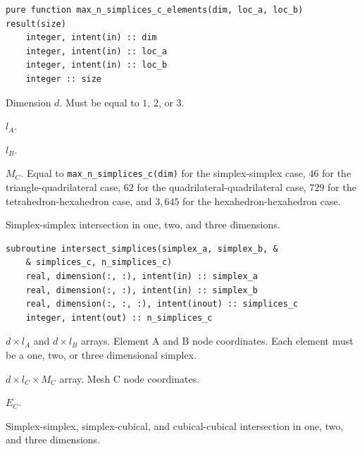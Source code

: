 \documentclass{article}
\begin{document}
\begin{lstlisting}[language=FORTRAN]
  pure function max_n_simplices_c_elements(dim, loc_a, loc_b) result(size)
    integer, intent(in) :: dim
    integer, intent(in) :: loc_a
    integer, intent(in) :: loc_b
    integer :: size
\end{lstlisting}

\begin{description}[font=\ttfamily\bfseries,leftmargin=2.2\parindent,labelindent=1.7\parindent,noitemsep]
  \item[dim] Dimension $d$. Must be equal to $1$, $2$, or $3$.
  \item[loc\_a] $l_A$.
  \item[loc\_b] $l_B$.
  \item[size] $M_C$. Equal to \verb+max_n_simplices_c(dim)+ for the
    simplex-simplex case, $46$ for the \linebreak triangle-quadrilateral case,
    $62$ for the quadrilateral-quadrilateral case, $729$ for the \linebreak
    tetrahedron-hexahedron case, and $3,645$ for the hexahedron-hexahedron case.
\end{description}

\noindent Simplex-simplex intersection in one, two, and three dimensions.

\begin{lstlisting}[language=FORTRAN]
  subroutine intersect_simplices(simplex_a, simplex_b, &
    & simplices_c, n_simplices_c)
    real, dimension(:, :), intent(in) :: simplex_a
    real, dimension(:, :), intent(in) :: simplex_b
    real, dimension(:, :, :), intent(inout) :: simplices_c
    integer, intent(out) :: n_simplices_c
\end{lstlisting}

\begin{description}[font=\ttfamily\bfseries,leftmargin=2.2\parindent,labelindent=1.7\parindent,noitemsep]
  \item[simplex\_a, simplex\_b] $d \times l_A$ and $d \times l_B$ arrays.
    Element A and B node coordinates. Each element must be a one, two, or three
    dimensional simplex.
  \item[simplex\_c] $d \times l_C \times M_C$ array. Mesh C node coordinates.
  \item[n\_simplices\_c] $E_C$.
\end{description}

\noindent Simplex-simplex, simplex-cubical, and cubical-cubical
intersection in one, two, and three dimensions.
\end{document}
